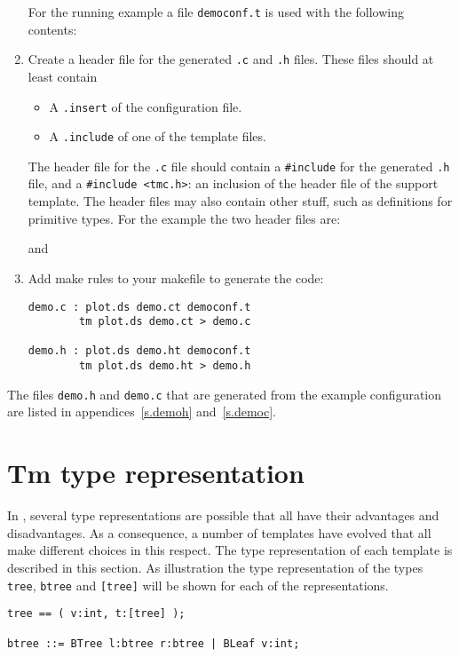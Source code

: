 \begin{enumerate}
For the running example a file {\tt democonf.t} is used with the
following contents:
\begin{listing}

\end{listing}
\item
Create a {\Tm} header file for the generated {\tt .c} and {\tt .h}
files.
These files should at least contain
\begin{itemize}
\item
A {\tt .insert} of the configuration file.
\item
A {\tt .include} of one of the template files.
\end{itemize}
The header file for the {\tt .c} file should contain a {\tt \#include}
for the generated {\tt .h} file,
and a {\tt \#include <tmc.h>}: an inclusion of the header file of the
{\C} support template.
The header files may also contain other stuff,
such as definitions for primitive types.
For the example the two header files are:
\begin{listing}

\end{listing}
and
\begin{listing}

\end{listing}
\item
Add make rules to your makefile to generate the code:
\begin{listing}
\begin{verbatim}
demo.c : plot.ds demo.ct democonf.t
        tm plot.ds demo.ct > demo.c

demo.h : plot.ds demo.ht democonf.t
        tm plot.ds demo.ht > demo.h
\end{verbatim}
\end{listing}
\end{enumerate}
\par
The files {\tt demo.h} and {\tt demo.c} that are generated from the
example configuration are listed
in appendices~\ref{s.demoh} and~\ref{s.democ}.
\section{Tm type representation}
In {\C},
several {\Tm} type representations are possible that all have their advantages
and disadvantages.
As a consequence,
a number of templates have evolved that all make different choices
in this respect.
The type representation of each template is described in this section.
As illustration the type representation of the types
{\tt tree}, {\tt btree} and \verb+[tree]+ will be shown
for each of the representations.
\begin{verbatim}
tree == ( v:int, t:[tree] );

btree ::= BTree l:btree r:btree | BLeaf v:int;
\end{verbatim}
